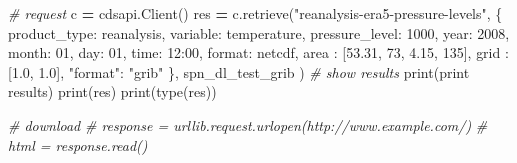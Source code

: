 \documentclass[
]{book}
\newenvironment{Shaded}{\begin{snugshade}}{\end{snugshade}}
\newcommand{\BuiltInTok}[1]{#1}
\newcommand{\CommentTok}[1]{\textcolor[rgb]{0.56,0.35,0.01}{\textit{#1}}}
\newcommand{\DecValTok}[1]{\textcolor[rgb]{0.00,0.00,0.81}{#1}}
\newcommand{\FloatTok}[1]{\textcolor[rgb]{0.00,0.00,0.81}{#1}}
\newcommand{\NormalTok}[1]{#1}
\newcommand{\OperatorTok}[1]{\textcolor[rgb]{0.81,0.36,0.00}{\textbf{#1}}}
\newcommand{\StringTok}[1]{\textcolor[rgb]{0.31,0.60,0.02}{#1}}
\begin{document}
\begin{Shaded}
\begin{Highlighting}[]
\CommentTok{\# request}
\NormalTok{c }\OperatorTok{=}\NormalTok{ cdsapi.Client()}
\NormalTok{res }\OperatorTok{=}\NormalTok{ c.retrieve(}\StringTok{"reanalysis{-}era5{-}pressure{-}levels"}\NormalTok{,}
\NormalTok{  \{}
    \StringTok{\textquotesingle{}product\_type\textquotesingle{}}\NormalTok{: }\StringTok{\textquotesingle{}reanalysis\textquotesingle{}}\NormalTok{,}
    \StringTok{\textquotesingle{}variable\textquotesingle{}}\NormalTok{: }\StringTok{\textquotesingle{}temperature\textquotesingle{}}\NormalTok{,}
    \StringTok{\textquotesingle{}pressure\_level\textquotesingle{}}\NormalTok{: }\StringTok{\textquotesingle{}1000\textquotesingle{}}\NormalTok{,}
    \StringTok{\textquotesingle{}year\textquotesingle{}}\NormalTok{: }\StringTok{\textquotesingle{}2008\textquotesingle{}}\NormalTok{,}
    \StringTok{\textquotesingle{}month\textquotesingle{}}\NormalTok{: }\StringTok{\textquotesingle{}01\textquotesingle{}}\NormalTok{,}
    \StringTok{\textquotesingle{}day\textquotesingle{}}\NormalTok{: }\StringTok{\textquotesingle{}01\textquotesingle{}}\NormalTok{,}
    \StringTok{\textquotesingle{}time\textquotesingle{}}\NormalTok{: }\StringTok{\textquotesingle{}12:00\textquotesingle{}}\NormalTok{,}
    \StringTok{\textquotesingle{}format\textquotesingle{}}\NormalTok{: }\StringTok{\textquotesingle{}netcdf\textquotesingle{}}\NormalTok{,                 }
    \StringTok{\textquotesingle{}area\textquotesingle{}}\NormalTok{          : [}\FloatTok{53.31}\NormalTok{, }\DecValTok{73}\NormalTok{, }\FloatTok{4.15}\NormalTok{, }\DecValTok{135}\NormalTok{], }
    \StringTok{\textquotesingle{}grid\textquotesingle{}}\NormalTok{          : [}\FloatTok{1.0}\NormalTok{, }\FloatTok{1.0}\NormalTok{],}
    \StringTok{"format"}\NormalTok{: }\StringTok{"grib"}
\NormalTok{  \},}
\NormalTok{  spn\_dl\_test\_grib}
\NormalTok{)}
\CommentTok{\# show results}
\BuiltInTok{print}\NormalTok{(}\StringTok{\textquotesingle{}print results\textquotesingle{}}\NormalTok{)}
\BuiltInTok{print}\NormalTok{(res)}
\BuiltInTok{print}\NormalTok{(}\BuiltInTok{type}\NormalTok{(res))}

\CommentTok{\# download }
\CommentTok{\# response = urllib.request.urlopen(\textquotesingle{}http://www.example.com/\textquotesingle{})}
\CommentTok{\# html = response.read()}
\end{Highlighting}
\end{Shaded}
\end{document}
